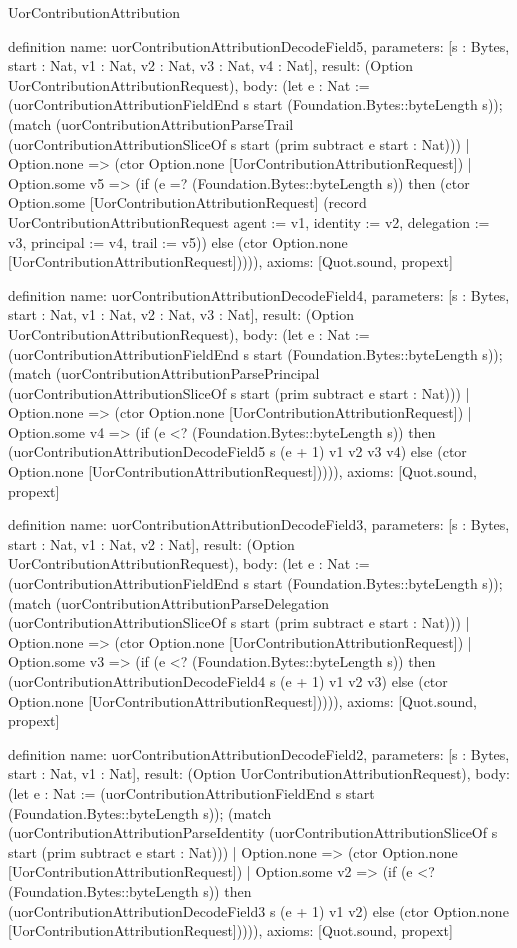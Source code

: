 \begin{lexlean}{UorContributionAttribution}
\begin{semanticmodule}
definition{
  name: uorContributionAttributionDecodeField5,
  parameters: [s : Bytes, start : Nat, v1 : Nat, v2 : Nat, v3 : Nat, v4 : Nat],
  result: (Option UorContributionAttributionRequest),
  body: (let e : Nat := (uorContributionAttributionFieldEnd s start (Foundation.Bytes::byteLength s)); (match (uorContributionAttributionParseTrail (uorContributionAttributionSliceOf s start (prim subtract e start : Nat)))
    | Option.none => (ctor Option.none [UorContributionAttributionRequest])
    | Option.some v5 => (if (e =? (Foundation.Bytes::byteLength s)) then (ctor Option.some [UorContributionAttributionRequest] (record UorContributionAttributionRequest {agent := v1, identity := v2, delegation := v3, principal := v4, trail := v5})) else (ctor Option.none [UorContributionAttributionRequest])))),
  axioms: [Quot.sound, propext]
}

definition{
  name: uorContributionAttributionDecodeField4,
  parameters: [s : Bytes, start : Nat, v1 : Nat, v2 : Nat, v3 : Nat],
  result: (Option UorContributionAttributionRequest),
  body: (let e : Nat := (uorContributionAttributionFieldEnd s start (Foundation.Bytes::byteLength s)); (match (uorContributionAttributionParsePrincipal (uorContributionAttributionSliceOf s start (prim subtract e start : Nat)))
    | Option.none => (ctor Option.none [UorContributionAttributionRequest])
    | Option.some v4 => (if (e <? (Foundation.Bytes::byteLength s)) then (uorContributionAttributionDecodeField5 s (e + 1) v1 v2 v3 v4) else (ctor Option.none [UorContributionAttributionRequest])))),
  axioms: [Quot.sound, propext]
}

definition{
  name: uorContributionAttributionDecodeField3,
  parameters: [s : Bytes, start : Nat, v1 : Nat, v2 : Nat],
  result: (Option UorContributionAttributionRequest),
  body: (let e : Nat := (uorContributionAttributionFieldEnd s start (Foundation.Bytes::byteLength s)); (match (uorContributionAttributionParseDelegation (uorContributionAttributionSliceOf s start (prim subtract e start : Nat)))
    | Option.none => (ctor Option.none [UorContributionAttributionRequest])
    | Option.some v3 => (if (e <? (Foundation.Bytes::byteLength s)) then (uorContributionAttributionDecodeField4 s (e + 1) v1 v2 v3) else (ctor Option.none [UorContributionAttributionRequest])))),
  axioms: [Quot.sound, propext]
}

definition{
  name: uorContributionAttributionDecodeField2,
  parameters: [s : Bytes, start : Nat, v1 : Nat],
  result: (Option UorContributionAttributionRequest),
  body: (let e : Nat := (uorContributionAttributionFieldEnd s start (Foundation.Bytes::byteLength s)); (match (uorContributionAttributionParseIdentity (uorContributionAttributionSliceOf s start (prim subtract e start : Nat)))
    | Option.none => (ctor Option.none [UorContributionAttributionRequest])
    | Option.some v2 => (if (e <? (Foundation.Bytes::byteLength s)) then (uorContributionAttributionDecodeField3 s (e + 1) v1 v2) else (ctor Option.none [UorContributionAttributionRequest])))),
  axioms: [Quot.sound, propext]
}


\end{semanticmodule}
\end{lexlean}
